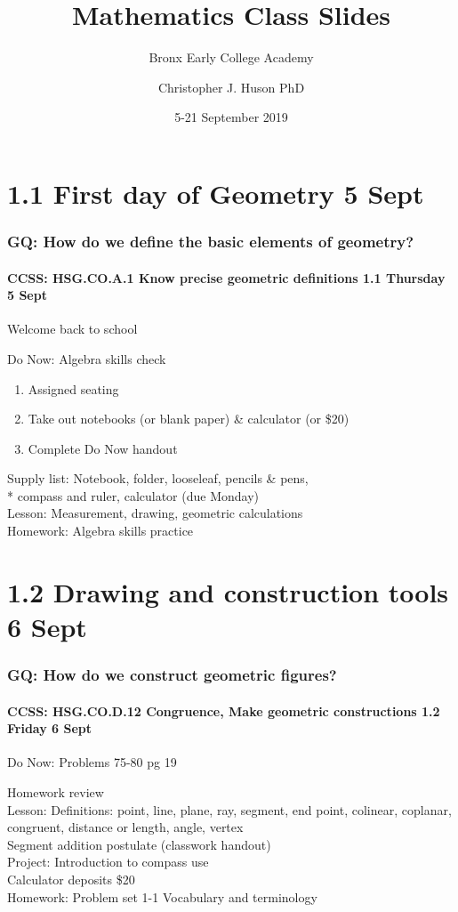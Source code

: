 \documentclass{beamer}
\title{Mathematics Class Slides}
\subtitle{Bronx Early College Academy}
\author{Christopher J. Huson PhD}
\date{5-21 September 2019}
\begin{document}
\frame{\titlepage}
\section[Outline]{}
\frame{\tableofcontents}

\section{1.1 First day of Geometry 5 Sept}
\frame
{
  \frametitle{GQ: How do we define the basic elements of geometry?}
  \framesubtitle{CCSS: HSG.CO.A.1 Know precise geometric definitions \hfill \alert{1.1 Thursday 5 Sept}}

  Welcome back to school
  \begin{block}{Do Now: Algebra skills check}
  \begin{enumerate}
      \item Assigned seating
      \item Take out notebooks (or blank paper) \& calculator (or \$20)
      \item Complete Do Now handout
  \end{enumerate}
  \end{block}
  Supply list: Notebook, folder, looseleaf, pencils \& pens, \\*
  compass and ruler, calculator \alert{(due Monday)} \\
  Lesson: Measurement, drawing, geometric calculations \\
  Homework: Algebra skills practice
}

\section{1.2 Drawing and construction tools 6 Sept}
\frame
{
  \frametitle{GQ: How do we construct geometric figures?}
  \framesubtitle{CCSS: HSG.CO.D.12 Congruence, Make geometric constructions  \hfill \alert{1.2 Friday 6 Sept}}

  \begin{block}{Do Now: Problems 75-80 pg 19}
  \end{block}
  Homework review\\
  Lesson: Definitions: point, line, plane, ray, segment, end point, colinear, coplanar, congruent, distance or length, angle, vertex \\%
  Segment addition postulate (classwork handout)\\
  Project: Introduction to compass use\\
  Calculator deposits \$20
  \\%
  Homework: Problem set 1-1 Vocabulary and terminology
}
\end{document}
